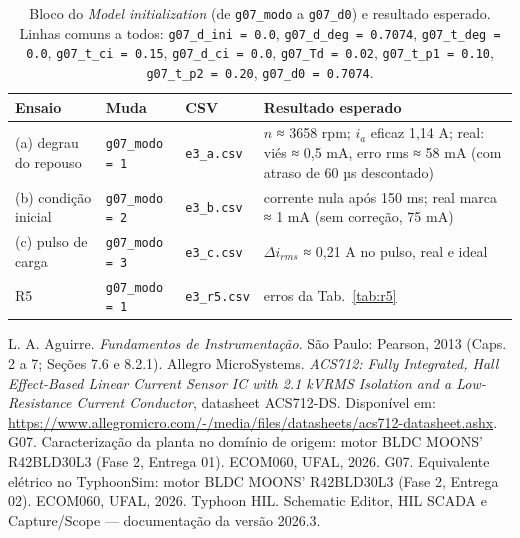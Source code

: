 \documentclass[10pt,a4paper]{article}
\begin{document}
\begin{table}[!htbp]\centering\footnotesize
\caption{Bloco do \emph{Model initialization} (de \texttt{g07\_modo} a \texttt{g07\_d0}) e resultado esperado. Linhas comuns a todos: \texttt{g07\_d\_ini = 0.0}, \texttt{g07\_d\_deg = 0.7074}, \texttt{g07\_t\_deg = 0.0}, \texttt{g07\_t\_ci = 0.15}, \texttt{g07\_d\_ci = 0.0}, \texttt{g07\_Td = 0.02}, \texttt{g07\_t\_p1 = 0.10}, \texttt{g07\_t\_p2 = 0.20}, \texttt{g07\_d0 = 0.7074}.}\label{tab:rot}
\begin{tabularx}{\textwidth}{p{3.4cm}p{2.0cm}p{1.9cm}Y}\toprule
Ensaio & Muda & CSV & Resultado esperado\\\midrule
(a) degrau do repouso & \texttt{g07\_modo = 1} & \texttt{e3\_a.csv} & $n$ ≈ 3658 rpm; $i_a$ eficaz 1,14 A; real: viés ≈ 0,5 mA, erro rms ≈ 58 mA (com atraso de 60 µs descontado)\\
(b) condição inicial & \texttt{g07\_modo = 2} & \texttt{e3\_b.csv} & corrente nula após 150 ms; real marca ≈ 1 mA (sem correção, 75 mA)\\
(c) pulso de carga & \texttt{g07\_modo = 3} & \texttt{e3\_c.csv} & $\Delta i_{rms}$ ≈ 0,21 A no pulso, real e ideal\\
R5 & \texttt{g07\_modo = 1} & \texttt{e3\_r5.csv} & erros da Tab.~\ref{tab:r5}\\\bottomrule
\end{tabularx}
\end{table}

\begin{thebibliography}{9}\small
{} L. A. Aguirre. \emph{Fundamentos de Instrumentação}. São Paulo: Pearson, 2013 (Caps. 2 a 7; Seções 7.6 e 8.2.1).
 Allegro MicroSystems. \emph{ACS712: Fully Integrated, Hall Effect-Based Linear Current Sensor IC with 2.1 kVRMS Isolation and a Low-Resistance Current Conductor}, datasheet ACS712-DS. Disponível em: \url{https://www.allegromicro.com/-/media/files/datasheets/acs712-datasheet.ashx}.
 G07. Caracterização da planta no domínio de origem: motor BLDC MOONS' R42BLD30L3 (Fase 2, Entrega 01). ECOM060, UFAL, 2026.
 G07. Equivalente elétrico no TyphoonSim: motor BLDC MOONS' R42BLD30L3 (Fase 2, Entrega 02). ECOM060, UFAL, 2026.
 Typhoon HIL. Schematic Editor, HIL SCADA e Capture/Scope — documentação da versão 2026.3.
\end{thebibliography}

\appendix
\end{document}
